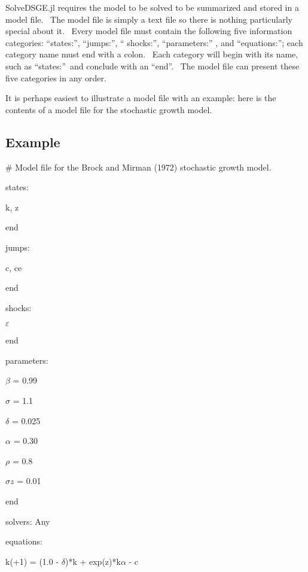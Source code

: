 \documentclass[notitlepage,11pt]{article}
\begin{document}
SolveDSGE.jl requires the model to be solved to be summarized and stored in
a model file. \ The model file is simply a text file so there is nothing
particularly special about it. \ Every model file must contain the following
five information categories: \textquotedblleft states:\textquotedblright ,
\textquotedblleft jumps:\textquotedblright , \textquotedblleft
shocks:\textquotedblright , \textquotedblleft parameters:\textquotedblright
, and \textquotedblleft equations:\textquotedblright ; each category name
must end with a colon. \ Each category will begin with its name, such as
\textquotedblleft states:\textquotedblright\ and conclude with an
\textquotedblleft end\textquotedblright . \ The model file can present these
five categories in any order.

It is perhaps easiest to illustrate a model file with an example: here is
the contents of a model file for the stochastic growth model.

\subsection{Example}

\# Model file for the Brock and Mirman (1972) stochastic growth model.

states:

k, z

end

\bigskip 

jumps:

c, ce

end

\bigskip 

shocks:

$\varepsilon $

end

\bigskip 

parameters:

$\beta $ = 0.99

$\sigma $ = 1.1

$\delta $ = 0.025

$\alpha $ = 0.30

$\rho $ = 0.8

$\sigma z$ = 0.01

end

\bigskip 

solvers: Any

\bigskip 

equations:

k(+1) = (1.0 - $\delta $)*k + exp(z)*k$\alpha $ - c
\end{document}
